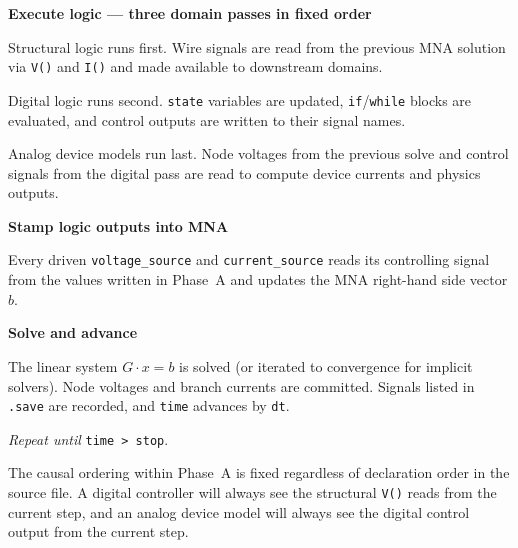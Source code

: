 \documentclass[11pt, a4paper]{article}
\newcommand{\code}[1]{\texttt{\small #1}}
\begin{document}
\begin{description}[leftmargin=2.5cm, labelwidth=2cm]

  \item[\textbf{Phase A}] \textbf{Execute logic — three domain passes in
  fixed order}

  \begin{description}[leftmargin=2.5cm, labelwidth=2.2cm]
    \item[\textit{1. module}] Structural logic runs first. Wire signals are
    read from the previous MNA solution via \code{V()} and \code{I()} and
    made available to downstream domains.

    \item[\textit{2. digital}] Digital logic runs second. \code{state}
    variables are updated, \code{if}/\code{while} blocks are evaluated, and
    control outputs are written to their signal names.

    \item[\textit{3. analog}] Analog device models run last. Node voltages
    from the previous solve and control signals from the digital pass are
    read to compute device currents and physics outputs.
  \end{description}

  \item[\textbf{Phase B}] \textbf{Stamp logic outputs into MNA}

  Every driven \code{voltage\_source} and \code{current\_source} reads its
  controlling signal from the values written in Phase~A and updates the
  MNA right-hand side vector \(b\).

  \item[\textbf{Phase C}] \textbf{Solve and advance}

  The linear system \(G \cdot x = b\) is solved (or iterated to convergence
  for implicit solvers). Node voltages and branch currents are committed.
  Signals listed in \code{.save} are recorded, and \code{time} advances by
  \code{dt}.

\end{description}

\noindent\textit{Repeat until} \code{time > stop}.

\bigskip

The causal ordering within Phase~A is fixed regardless of declaration order
in the source file. A digital controller will always see the structural
\code{V()} reads from the current step, and an analog device model will
always see the digital control output from the current step.
\end{document}
